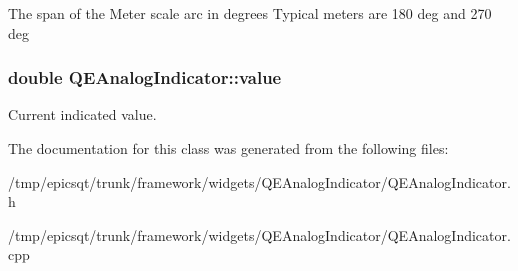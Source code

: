 \label{classQEAnalogIndicator_a729a2313bdac9b7d6d49ecd4158d0aea}
The span of the Meter scale arc in degrees Typical meters are 180 deg and 270 deg \hypertarget{classQEAnalogIndicator_ad6440740a8cf86c832157ba7930b48b0}{
\subsubsection[{value}]{\setlength{\rightskip}{0pt plus 5cm}double QEAnalogIndicator::value}}
\label{classQEAnalogIndicator_ad6440740a8cf86c832157ba7930b48b0}
Current indicated value. 

The documentation for this class was generated from the following files:\begin{DoxyCompactItemize}
\item 
/tmp/epicsqt/trunk/framework/widgets/QEAnalogIndicator/QEAnalogIndicator.h\item 
/tmp/epicsqt/trunk/framework/widgets/QEAnalogIndicator/QEAnalogIndicator.cpp\end{DoxyCompactItemize}
